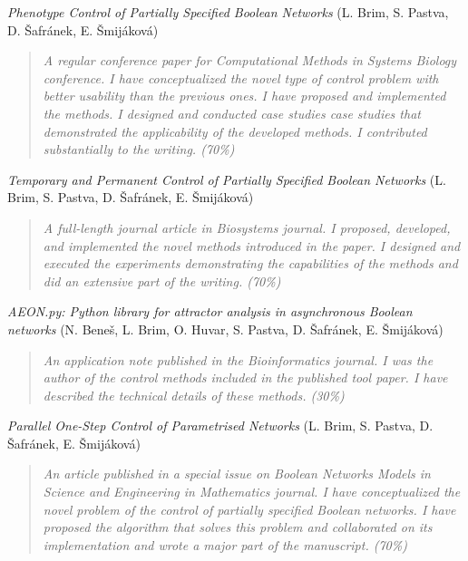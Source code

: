 \medskip
\noindent\PrimaryColor{\spacedlowsmallcaps{[CMSB'23]}}\hspace{3pt} \emph{Phenotype Control of Partially Specified Boolean Net\-works} (L. Brim, S. Pastva, D. Šafránek, E. Šmijáková)~\cite{Benes2023b}


\begin{quotation}
	\emph{A regular conference paper for Computational Methods in Systems Biology conference. I have conceptualized the novel type of control problem with better usability than the previous ones. I have proposed and implemented the methods. I designed and conducted case studies case studies that demonstrated the applicability of the developed methods. I contributed substantially to the writing. (70\%)}
\end{quotation}


\medskip
\noindent\PrimaryColor{\spacedlowsmallcaps{[Biosys'23]}}\hspace{3pt} \emph{Temporary and Permanent Control of Partially Specified Boolean Networks} (L. Brim, S. Pastva, D. Šafránek, E. Šmijáková) \cite{brim2022}

\begin{quotation}
	\emph{A full-length journal article in Biosystems journal. I proposed, developed, and implemented the novel methods introduced in the paper. I designed and executed the experiments demonstrating the capabilities of the methods and did an extensive part of the writing. (70\%)}
\end{quotation}


\medskip
\noindent\PrimaryColor{\spacedlowsmallcaps{[Bioinf'23]}}\hspace{3pt} \emph{AEON.py: Python library for attractor analysis in asynchronous Boolean networks
} (N. Beneš, L. Brim, O. Huvar, S. Pastva, D. Šafránek, E. Šmijáková)~\cite{aeonpy}

\begin{quotation}
	\emph{An application note published in the Bioinformatics journal. I was the author of the control methods included in the published tool paper. I have described the technical details of these methods. (30\%)}
\end{quotation}

\medskip
\noindent\PrimaryColor{\spacedlowsmallcaps{[Mathem'20]}}\hspace{3pt} \emph{Parallel One-Step Control of Parametrised  Networks} (L. Brim, S. Pastva, D. Šafránek, E. Šmijáková)~\cite{Brim2021}

\begin{quotation}
	\emph{An article published in a special issue on Boolean Networks Models in Science and Engineering in Mathematics journal. I have conceptualized the novel problem of the control of partially specified Boolean networks. I have proposed the algorithm that solves this problem and collaborated on its implementation and wrote a major part of the man\-u\-script. (70\%)}
\end{quotation}


